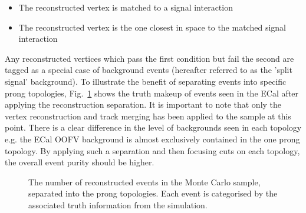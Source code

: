 \begin{itemize}
  \item The reconstructed vertex is matched to a signal interaction
  \item The reconstructed vertex is the one closest in space to the matched signal interaction
\end{itemize}
Any reconstructed vertices which pass the first condition but fail the second are tagged as a special case of background events (hereafter referred to as the 'split signal' background).
\newline
\newline
To illustrate the benefit of separating events into specific prong topologies, Fig.~\ref{fig:ProngStackAll} shows the truth makeup of events seen in the ECal after applying the reconstruction separation.  It is important to note that only the vertex reconstruction and track merging has been applied to the sample at this point.  There is a clear difference in the level of backgrounds seen in each topology e.g. the ECal OOFV background is almost exclusively contained in the one prong topology.  By applying such a separation and then focusing cuts on each topology, the overall event purity should be higher. 
\begin{figure}
  \centering
  \caption{The number of reconstructed events in the Monte Carlo sample, separated into the prong topologies.  Each event is categorised by the associated truth information from the simulation.}
  \label{fig:ProngStackAll}
\end{figure}

